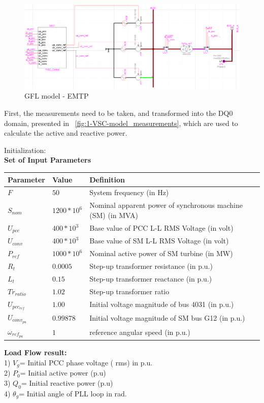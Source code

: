 \documentclass{report}
\begin{document}
\begin{figure}[H]
    \centering
    \includegraphics[scale = 0.4]{Figure_1VSC/GFL_EMTP.png}
    \caption{GFL model - EMTP}
    \label{fig:GFL_model_EMTP}
\end{figure}

First, the measurements need to be taken, and transformed into the DQ0 domain, presented in \figurename~\ref{fig:1-VSC-model_measurements}, which are used to calculate the active and reactive power.

Initialization:\\
\textbf{Set of Input Parameters}
\begin{table}[H]
\centering
\begin{tabular}{|l | l |l |}  
\hline
Parameter & Value & Definition \\
 \hline
 \hline
   $F$ &  $50$ & System frequency (in Hz) \\
  \hline
   $S_{nom}$ &  $1200*10^6$ & Nominal apparent power of synchronous machine (SM) (in MVA) \\
  \hline
  $U_{pcc}$ &  $400*10^3$ & Base value of PCC L-L RMS Voltage (in volt) \\
  \hline
$U_{conv}$ &  $400*10^3$ & Base value of SM L-L RMS Voltage (in volt) \\
\hline
 $P_{ref}$ &  $1000*10^6$ & Nominal active power of SM turbine (in MW) \\
  \hline
   $R_t$ &  $0.0005$ & Step-up transformer resistance (in p.u.) \\
  \hline
  $L_t$ &  $0.15$ & Step-up transformer reactance (in p.u.) \\
  \hline
  $Tr_{ratio}$ &  $1.02$ & Step-up transformer ratio  \\
  \hline
  $U_{pcc_{ref}}$ &  $1.00$ & Initial voltage magnitude of bus 4031 (in p.u.)  \\
  \hline
  $U_{conv_{pu}}$ &  $0.99878$ & Initial voltage magnitude of SM bus G12 (in p.u.)  \\
  \hline
  $\omega_{ref_{pu}}$ &  $1$ & reference angular speed (in p.u.)  \\
  \hline
\end{tabular}
\end{table}
\textbf{Load Flow result:}\\ 
1) $V_g$= Initial PCC phase voltage  ( rms) in p.u.\\
2) $P_0$= Initial active power (p.u)\\
3) $Q_0$= Initial reactive power (p.u)\\
4) $\theta_g$= Initial angle of PLL loop in rad.\\
\end{document}
